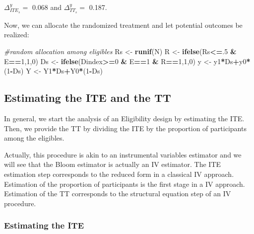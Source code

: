 \documentclass[]{book}
\newenvironment{Shaded}{\begin{snugshade}}{\end{snugshade}}
\newcommand{\KeywordTok}[1]{\textcolor[rgb]{0.13,0.29,0.53}{\textbf{#1}}}
\newcommand{\DecValTok}[1]{\textcolor[rgb]{0.00,0.00,0.81}{#1}}
\newcommand{\StringTok}[1]{\textcolor[rgb]{0.31,0.60,0.02}{#1}}
\newcommand{\CommentTok}[1]{\textcolor[rgb]{0.56,0.35,0.01}{\textit{#1}}}
\newcommand{\OperatorTok}[1]{\textcolor[rgb]{0.81,0.36,0.00}{\textbf{#1}}}
\newcommand{\NormalTok}[1]{#1}
\theoremstyle{definition}
\theoremstyle{definition}
\theoremstyle{definition}
\theoremstyle{remark}
\begin{document}
\(\Delta^y_{ITE_s}=\) 0.068 and \(\Delta^y_{TT_s}=\) 0.187.

Now, we can allocate the randomized treatment and let potential outcomes
be realized:

\begin{Shaded}
\begin{Highlighting}[]
\CommentTok{#random allocation among eligibles}
\NormalTok{Rs <-}\StringTok{ }\KeywordTok{runif}\NormalTok{(N)}
\NormalTok{R <-}\StringTok{ }\KeywordTok{ifelse}\NormalTok{(Rs}\OperatorTok{<=}\NormalTok{.}\DecValTok{5} \OperatorTok{&}\StringTok{ }\NormalTok{E}\OperatorTok{==}\DecValTok{1}\NormalTok{,}\DecValTok{1}\NormalTok{,}\DecValTok{0}\NormalTok{)}
\NormalTok{Ds <-}\StringTok{ }\KeywordTok{ifelse}\NormalTok{(Dindex}\OperatorTok{>=}\DecValTok{0} \OperatorTok{&}\StringTok{ }\NormalTok{E}\OperatorTok{==}\DecValTok{1} \OperatorTok{&}\StringTok{ }\NormalTok{R}\OperatorTok{==}\DecValTok{1}\NormalTok{,}\DecValTok{1}\NormalTok{,}\DecValTok{0}\NormalTok{)}
\NormalTok{y <-}\StringTok{ }\NormalTok{y1}\OperatorTok{*}\NormalTok{Ds}\OperatorTok{+}\NormalTok{y0}\OperatorTok{*}\NormalTok{(}\DecValTok{1}\OperatorTok{-}\NormalTok{Ds)}
\NormalTok{Y <-}\StringTok{ }\NormalTok{Y1}\OperatorTok{*}\NormalTok{Ds}\OperatorTok{+}\NormalTok{Y0}\OperatorTok{*}\NormalTok{(}\DecValTok{1}\OperatorTok{-}\NormalTok{Ds)}
\end{Highlighting}
\end{Shaded}

\subsection{Estimating the ITE and the
TT}\label{estimating-the-ite-and-the-tt}

In general, we start the analysis of an Eligibility design by estimating
the ITE. Then, we provide the TT by dividing the ITE by the proportion
of participants among the eligibles.

Actually, this procedure is akin to an instrumental variables estimator
and we will see that the Bloom estimator is actually an IV estimator.
The ITE estimation step corresponds to the reduced form in a classical
IV approach. Estimation of the proportion of participants is the first
stage in a IV approach. Estimation of the TT corresponds to the
structural equation step of an IV procedure.

\subsubsection{Estimating the ITE}\label{estimating-the-ite}
\end{document}

